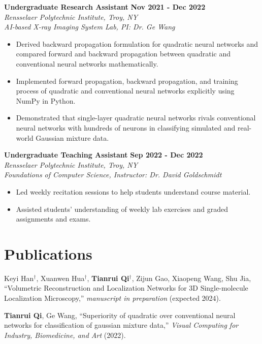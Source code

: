 \documentclass[letterpaper, 11pt]{article}
\newcommand{\subsectionvspace}{\vspace{6pt}}
\begin{document}
    \textbf{Undergraduate Research Assistant} \hfill 
    \textbf{Nov 2021 - Dec 2022} \\
    \textit{Rensselaer Polytechnic Institute, Troy, NY} \\
    \textit{AI-based X-ray Imaging System Lab, PI: Dr. Ge Wang}
    \begin{itemize}
        \item Derived backward propagation formulation for quadratic neural networks and compared forward and backward propagation between quadratic and conventional neural networks mathematically.
        \item Implemented forward propagation, backward propagation, and training process of quadratic and conventional neural networks explicitly using NumPy in Python.
        \item Demonstrated that single-layer quadratic neural networks rivals conventional neural networks with hundreds of neurons in classifying simulated and real-world Gaussian mixture data.
    \end{itemize}

    \subsectionvspace

    \textbf{Undergraduate Teaching Assistant} \hfill 
    \textbf{Sep 2022 - Dec 2022} \\
    \textit{Rensselaer Polytechnic Institute, Troy, NY} \\
    \textit{Foundations of Computer Science, Instructor: Dr. David Goldschmidt}
    \begin{itemize}
        \item Led weekly recitation sessions to help students understand course material.
        \item Assisted students' understanding of weekly lab exercises and graded assignments and exams.
    \end{itemize}


\section{Publications}


    Keyi Han$^\dag$, Xuanwen Hua$^\dag$, \textbf{Tianrui Qi}$^\dag$, Zijun Gao, Xiaopeng Wang, Shu Jia, ``Volumetric Reconstruction and Localization Networks for 3D Single-molecule Localization Microscopy,'' \textit{manuscript in preparation} (expected 2024).

    \subsectionvspace

    \textbf{Tianrui Qi}, Ge Wang, ``Superiority of quadratic over conventional neural networks for classification of gaussian mixture data,'' \textit{Visual Computing for Industry, Biomedicine, and Art} (2022).
\end{document}
